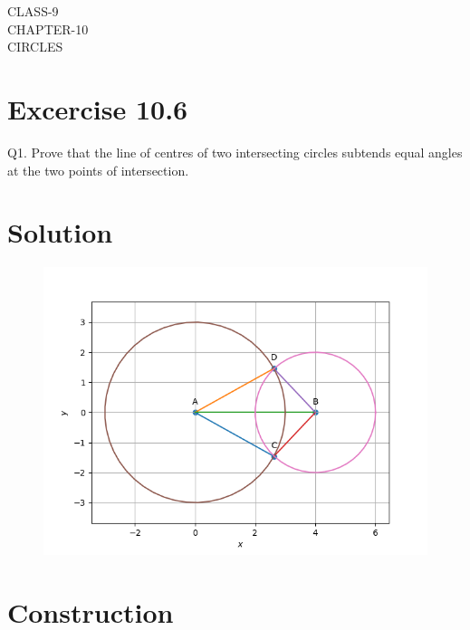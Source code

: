 \documentclass[12pt]{article}
\begin{document}
\begin{center}
\textbf\large{CLASS-9\\CHAPTER-10 \\ CIRCLES}

\end{center}
\section*{Excercise 10.6}

Q1. Prove that the line of centres of two intersecting circles subtends equal angles at the two points of intersection.
\section*{\large Solution}
\begin{figure}[h!]
\centering
\includegraphics[width=\columnwidth]{figs/circle2.png}
\caption{}
\label{fig:Fig1}
\end{figure}
\section*{\large Construction}

\begin{table}[h!]
	\small
	\centering
     
	\label{table:table1}
	\end{table}
\end{document}
